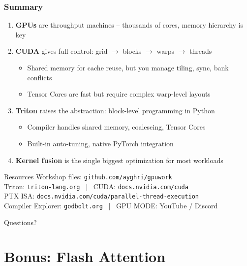 \documentclass[aspectratio=169]{beamer}
\begin{document}
\begin{frame}
	\frametitle{Summary}
	\begin{enumerate}
		\item \textbf{GPUs} are throughput machines -- thousands of cores, memory hierarchy is key
		\item \textbf{CUDA} gives full control: grid $\rightarrow$ blocks $\rightarrow$ warps $\rightarrow$ threads
		      \begin{itemize}
			      \item Shared memory for cache reuse, but you manage tiling, sync, bank conflicts
			      \item Tensor Cores are fast but require complex warp-level layouts
		      \end{itemize}
		\item \textbf{Triton} raises the abstraction: block-level programming in Python
		      \begin{itemize}
			      \item Compiler handles shared memory, coalescing, Tensor Cores
			      \item Built-in auto-tuning, native PyTorch integration
		      \end{itemize}
		\item \textbf{Kernel fusion} is the single biggest optimization for most workloads
	\end{enumerate}
	\vspace{0.5em}
	\begin{block}{Resources}
		Workshop files: \texttt{github.com/ayghri/gpuwork} \\
		Triton: \texttt{triton-lang.org} ~|~
		CUDA: \texttt{docs.nvidia.com/cuda} \\
		PTX ISA: \texttt{docs.nvidia.com/cuda/parallel-thread-execution} \\
		Compiler Explorer: \texttt{godbolt.org} ~|~
		GPU MODE: YouTube / Discord
	\end{block}
	\begin{center}
		\Large\textcolor{codegreen}{Questions?}
	\end{center}
\end{frame}

\section{Bonus: Flash Attention}
\end{document}
